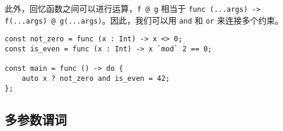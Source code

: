 此外，回忆函数之间可以进行运算，\lstinline!f @ g! 相当于 \lstinline!func (...args) -> f(...args) @ g(...args)!。因此，我们可以用 \lstinline!and! 和 \lstinline!or! 来连接多个约束。

\begin{lstlisting}
const not_zero = func (x : Int) -> x <> 0;
const is_even = func (x : Int) -> x `mod` 2 == 0;

const main = func () -> do {
    auto x ? not_zero and is_even = 42;
};
\end{lstlisting}


\subsection{多参数谓词}

